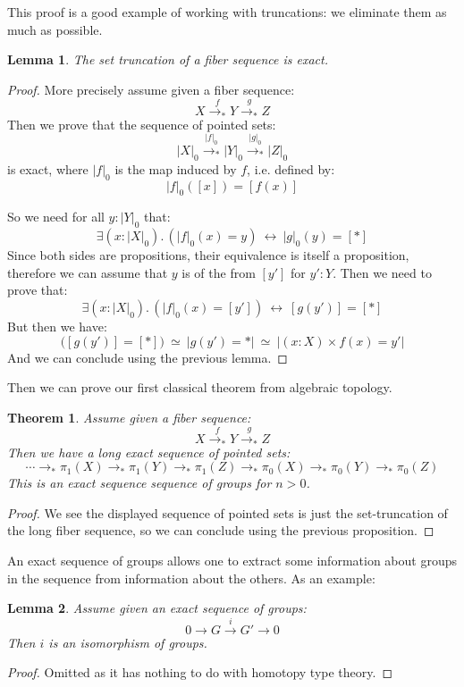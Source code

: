 \documentclass{article}
\renewcommand{\r}{\rightarrow}
\newtheorem{lemma}{Lemma}
\newtheorem{theorem}{Theorem}
\begin{document}
This proof is a good example of working with truncations: we eliminate them as much as possible.

\begin{lemma}
The set truncation of a fiber sequence is exact.
\end{lemma}
\begin{proof}
More precisely assume given a fiber sequence:
\[X \overset{f}{\r_*} Y\overset{g}{\r_*} Z\] 
Then we prove that the sequence of pointed sets:
\[|X|_0\overset{|f|_0}{\r_*} |Y|_0\overset{|g|_0}{\r_*} |Z|_0\] 
is exact, where $|f|_0$ is the map induced by $f$, i.e. defined by: 
\[|f|_0([x]) = [f(x)]\] 

So we need for all $y:|Y|_0$ that: 
\[\exists(x:|X|_0).\,(|f|_0(x) = y) \ \leftrightarrow\ |g|_0(y)=[*] \]
Since both sides are propositions, their equivalence is itself a proposition, therefore we can assume that $y$ is of the from $[y']$ for $y':Y$. Then we need to prove that:
\[\exists(x:|X|_0).\,(|f|_0(x) = [y']) \ \leftrightarrow\ [g(y')]=[*] \]
But then we have:
\[ \big([g(y')]=[*]\big) \ \simeq\ |g(y')=*|\ \simeq\ |(x:X)\times f(x)=y'|\]
And we can conclude using the previous lemma.
\end{proof}

Then we can prove our first classical theorem from algebraic topology.

\begin{theorem}
Assume given a fiber sequence:
\[X \overset{f}{\r_*} Y\overset{g}{\r_*} Z\] 
Then we have a long exact sequence of pointed sets:
\[\cdots \r_* \pi_1(X)\r_*\pi_1(Y)\r_*\pi_1(Z) \r_* \pi_0(X)\r_*\pi_0(Y)\r_*\pi_0(Z)\]
This is an exact sequence sequence of groups for $n>0$. 
\end{theorem}
\begin{proof}
We see the displayed sequence of pointed sets is just the set-truncation of the long fiber sequence, so we can conclude using the previous proposition.%
\end{proof}

An exact sequence of groups allows one to extract some information about groups in the sequence from information about the others. As an example:

\begin{lemma}
Assume given an exact sequence of groups:
\[0 \r G \overset{i}{\r} G' \r 0\]
Then $i$ is an isomorphism of groups.
\end{lemma}
\begin{proof}
Omitted as it has nothing to do with homotopy type theory.
\end{proof}
\end{document}
